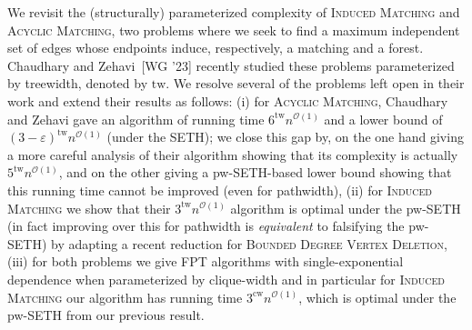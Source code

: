 We revisit the (structurally) parameterized complexity of \textsc{Induced Matching} and \textsc{Acyclic Matching},
two problems where we seek to find a maximum independent set of edges whose endpoints induce,
respectively, a matching and a forest.
Chaudhary and Zehavi~[WG '23] recently studied these problems parameterized by treewidth, denoted by $\mathrm{tw}$.
We resolve several of the problems left open in their work and extend their results as follows:
(i) for \textsc{Acyclic Matching}, Chaudhary and Zehavi gave an algorithm of running time
$6^{\mathrm{tw}}n^{\mathcal{O}(1)}$ and a lower bound of
$(3-\varepsilon)^{\mathrm{tw}}n^{\mathcal{O}(1)}$ (under the SETH);
we close this gap by, on the one hand giving a more careful analysis of their
algorithm showing that its complexity is actually $5^{\mathrm{tw}} n^{\mathcal{O}(1)}$,
and on the other giving a pw-SETH-based lower bound showing that this running time cannot be improved
(even for pathwidth),
(ii) for \textsc{Induced Matching} we show that their $3^{\mathrm{tw}} n^{\mathcal{O}(1)}$
algorithm is optimal under the pw-SETH (in fact improving over this for pathwidth is \emph{equivalent} to falsifying the pw-SETH)
by adapting a recent reduction for \textsc{Bounded Degree Vertex Deletion},
(iii) for both problems we give FPT algorithms with single-exponential dependence when
parameterized by clique-width and in particular for \textsc{Induced Matching}
our algorithm has running time $3^{\mathrm{cw}} n^{\mathcal{O}(1)}$,
which is optimal under the pw-SETH from our previous result.

